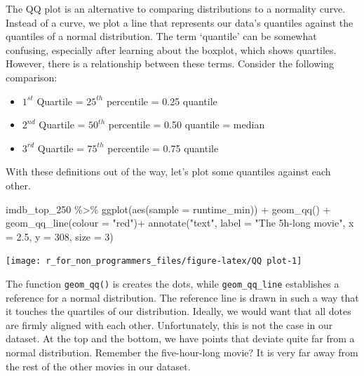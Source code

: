\documentclass[
]{book}
\newenvironment{Shaded}{\begin{snugshade}}{\end{snugshade}}
\newcommand{\AttributeTok}[1]{\textcolor[rgb]{0.77,0.63,0.00}{#1}}
\newcommand{\DecValTok}[1]{\textcolor[rgb]{0.00,0.00,0.81}{#1}}
\newcommand{\FloatTok}[1]{\textcolor[rgb]{0.00,0.00,0.81}{#1}}
\newcommand{\FunctionTok}[1]{\textcolor[rgb]{0.00,0.00,0.00}{#1}}
\newcommand{\NormalTok}[1]{#1}
\newcommand{\SpecialCharTok}[1]{\textcolor[rgb]{0.00,0.00,0.00}{#1}}
\newcommand{\StringTok}[1]{\textcolor[rgb]{0.31,0.60,0.02}{#1}}
\begin{document}
The QQ plot is an alternative to comparing distributions to a normality curve. Instead of a curve, we plot a line that represents our data's quantiles against the quantiles of a normal distribution. The term `quantile' can be somewhat confusing, especially after learning about the boxplot, which shows quartiles. However, there is a relationship between these terms. Consider the following comparison:

\begin{itemize}
\item
  \(1^{st}\) Quartile = \(25^{th}\) percentile = 0.25 quantile
\item
  \(2^{nd}\) Quartile = \(50^{th}\) percentile = 0.50 quantile = median
\item
  \(3^{rd}\) Quartile = \(75^{th}\) percentile = 0.75 quantile
\end{itemize}

With these definitions out of the way, let's plot some quantiles against each other.

\begin{Shaded}
\begin{Highlighting}[]
\NormalTok{imdb\_top\_250 }\SpecialCharTok{\%\textgreater{}\%}
  \FunctionTok{ggplot}\NormalTok{(}\FunctionTok{aes}\NormalTok{(}\AttributeTok{sample =}\NormalTok{ runtime\_min)) }\SpecialCharTok{+}
  \FunctionTok{geom\_qq}\NormalTok{() }\SpecialCharTok{+}
  \FunctionTok{geom\_qq\_line}\NormalTok{(}\AttributeTok{colour =} \StringTok{"red"}\NormalTok{)}\SpecialCharTok{+}
  \FunctionTok{annotate}\NormalTok{(}\StringTok{"text"}\NormalTok{,}
           \AttributeTok{label =} \StringTok{"The 5h{-}long movie"}\NormalTok{,}
           \AttributeTok{x =} \FloatTok{2.5}\NormalTok{,}
           \AttributeTok{y =} \DecValTok{308}\NormalTok{,}
           \AttributeTok{size =} \DecValTok{3}\NormalTok{)}
\end{Highlighting}
\end{Shaded}

\begin{center}\texttt{[image: r\_for\_non\_programmers\_files/figure-latex/QQ plot-1]} \end{center}

The function \texttt{geom\_qq()} is creates the dots, while \texttt{geom\_qq\_line} establishes a reference for a normal distribution. The reference line is drawn in such a way that it touches the quartiles of our distribution. Ideally, we would want that all dotes are firmly aligned with each other. Unfortunately, this is not the case in our dataset. At the top and the bottom, we have points that deviate quite far from a normal distribution. Remember the five-hour-long movie? It is very far away from the rest of the other movies in our dataset.
\end{document}

